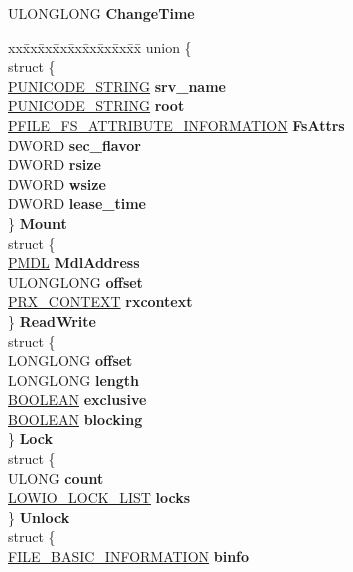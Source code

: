 \begin{DoxyCompactItemize}
U\+L\+O\+N\+G\+L\+O\+NG {\bfseries Change\+Time}
\item 
\mbox{\label{struct__updowncall__entry_a08129964baef36b96bccdeffa775feb9}} 
\begin{tabbing}
xx\=xx\=xx\=xx\=xx\=xx\=xx\=xx\=xx\=\kill
union \{\\
\>struct \{\\
\>\>\hyperlink{struct___u_n_i_c_o_d_e___s_t_r_i_n_g}{PUNICODE\_STRING} {\bfseries srv\_name}\\
\>\>\hyperlink{struct___u_n_i_c_o_d_e___s_t_r_i_n_g}{PUNICODE\_STRING} {\bfseries root}\\
\>\>\hyperlink{struct___f_i_l_e___f_s___a_t_t_r_i_b_u_t_e___i_n_f_o_r_m_a_t_i_o_n}{PFILE\_FS\_ATTRIBUTE\_INFORMATION} {\bfseries FsAttrs}\\
\>\>DWORD {\bfseries sec\_flavor}\\
\>\>DWORD {\bfseries rsize}\\
\>\>DWORD {\bfseries wsize}\\
\>\>DWORD {\bfseries lease\_time}\\
\>\} {\bfseries Mount}\\
\>struct \{\\
\>\>\hyperlink{interfacevoid}{PMDL} {\bfseries MdlAddress}\\
\>\>ULONGLONG {\bfseries offset}\\
\>\>\hyperlink{struct___r_x___c_o_n_t_e_x_t}{PRX\_CONTEXT} {\bfseries rxcontext}\\
\>\} {\bfseries ReadWrite}\\
\>struct \{\\
\>\>LONGLONG {\bfseries offset}\\
\>\>LONGLONG {\bfseries length}\\
\>\>\hyperlink{_processor_bind_8h_a112e3146cb38b6ee95e64d85842e380a}{BOOLEAN} {\bfseries exclusive}\\
\>\>\hyperlink{_processor_bind_8h_a112e3146cb38b6ee95e64d85842e380a}{BOOLEAN} {\bfseries blocking}\\
\>\} {\bfseries Lock}\\
\>struct \{\\
\>\>ULONG {\bfseries count}\\
\>\>\hyperlink{struct___l_o_w_i_o___l_o_c_k___l_i_s_t}{LOWIO\_LOCK\_LIST} {\bfseries locks}\\
\>\} {\bfseries Unlock}\\
\>struct \{\\
\>\>\hyperlink{struct___f_i_l_e___b_a_s_i_c___i_n_f_o_r_m_a_t_i_o_n}{FILE\_BASIC\_INFORMATION} {\bfseries binfo}\\

\end{tabbing}
\end{DoxyCompactItemize}
